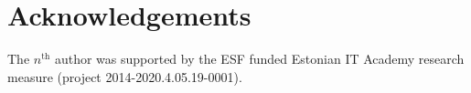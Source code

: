 \documentclass[a4paper,11pt]{amsart}
\title{}
\author{Fosco Loregian}
\begin{document}
\maketitle 
\begin{abstract}

\end{abstract}
\tableofcontents






\section{Acknowledgements}
The {\color{red} $n^\text{th}$} author was supported by the ESF funded Estonian IT Academy research measure (project 2014-2020.4.05.19-0001).

\end{document}
